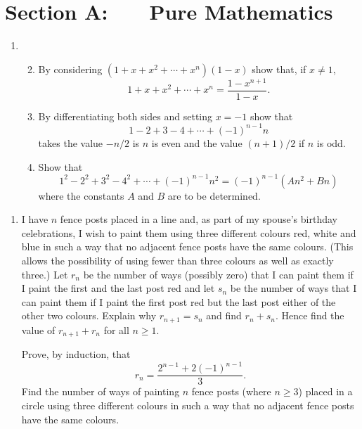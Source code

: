 \documentclass[a4, 11pt]{report}
\newlength{\qspace}
\newcounter{qnumber}
\newenvironment{question}%
 {\vspace{\qspace}
  \begin{enumerate}[\bfseries 1\quad][10]%
    \setcounter{enumi}{\value{qnumber}}%
    \item%
 }
{
  \end{enumerate}
  \filbreak
  \stepcounter{qnumber}
 }
\newenvironment{questionparts}[1][1]%
 {
  \begin{enumerate}[\bfseries (i)]%
    \setcounter{enumii}{#1}
    \addtocounter{enumii}{-1}
    \setlength{\itemsep}{5mm}
    \setlength{\parskip}{8pt}
 }
 {
  \end{enumerate}
 }
\begin{document}
\setcounter{page}{2}

 
\section*{Section A: \ \ \ Pure Mathematics}

\begin{question}
\begin{questionparts} 
\item By considering $(1+x+x^{2}+\cdots+x^{n})(1-x)$
show that, if $x\neq1$, 
\[
1+x+x^{2}+\cdots+x^{n}=\frac{1-x^{n+1}}{1-x}.
\]
\item By differentiating both sides and setting $x=-1$ show that
\[
1-2+3-4+\cdots+(-1)^{n-1}n
\]
takes the value $-n/2$ is $n$ is even and the value $(n+1)/2$ if
$n$ is odd.
\item Show that 
\[
1^{2}-2^{2}+3^{2}-4^{2}+\cdots+(-1)^{n-1}n^{2}=(-1)^{n-1}(An^{2}+Bn)
\]
where the constants $A$ and $B$ are to be determined. 
\end{questionparts}
\end{question}

\begin{question}
I have $n$ fence posts placed in a line and, as part of my spouse's
birthday celebrations, I wish to paint them using three different
colours red, white and blue in such a way that no adjacent fence posts
have the same colours. (This allows the possibility of using fewer
than three colours as well as exactly three.) Let $r_{n}$ be the
number of ways (possibly zero) that I can paint them if I paint the
first and the last post red and let $s_{n}$ be the number of ways
that I can paint them if I paint the first post red but the last post
either of the other two colours. Explain why $r_{n+1}=s_{n}$ and
find $r_{n}+s_{n}.$ Hence find the value of $r_{n+1}+r_{n}$ for
all $n\geqslant1.$ 


Prove, by induction, that 
\[
r_{n}=\frac{2^{n-1}+2(-1)^{n-1}}{3}.
\]
Find the number of ways of painting $n$ fence posts (where $n\geqslant3$)
placed in a circle using three different colours in such a way that
no adjacent fence posts have the same colours.
\end{question}
\end{document}
